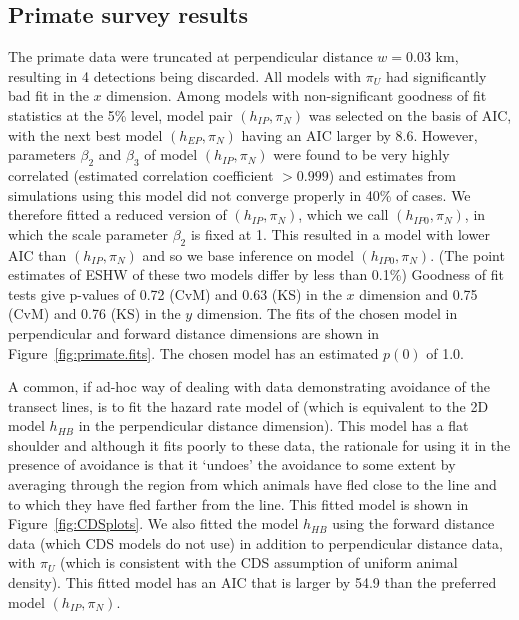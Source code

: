 \documentclass[useAMS,usenatbib,referee]{biom}
\begin{document}
\subsection{Primate survey results}

The primate data were truncated at perpendicular distance $w=0.03$ km, resulting in 4 detections being discarded. All models with $\pi_{U}$ had significantly bad fit in the $x$ dimension. Among models with non-significant goodness of fit statistics at the 5\% level, model pair $(h_{IP},\pi_{N})$ was selected on the basis of AIC, with the next best model $(h_{EP},\pi_{N})$ having an AIC larger by 8.6. However, parameters $\beta_2$ and $\beta_3$ of model $(h_{IP},\pi_{N})$ were found to be very highly correlated (estimated correlation coefficient $>0.999$) and estimates from simulations using this model did not converge properly in 40\% of cases. We therefore fitted a reduced version of $(h_{IP},\pi_{N})$, which we call $(h_{IP0},\pi_{N})$, in which the scale parameter $\beta_2$ is fixed at 1. This resulted in a model with lower AIC than $(h_{IP},\pi_{N})$ and so we base inference on model $(h_{IP0},\pi_{N})$. (The point estimates of ESHW of these two models differ by less than 0.1\%) Goodness of fit tests give p-values of 0.72 (CvM)  and 0.63 (KS) in the $x$ dimension and 0.75 (CvM)  and 0.76 (KS) in the $y$ dimension. The fits of the chosen model in perpendicular and forward distance dimensions are shown in Figure~\ref{fig:primate.fits}. The chosen model has an estimated $p(0)$ of 1.0. 

A common, if ad-hoc way of dealing with data demonstrating avoidance of the transect lines, is to fit the hazard rate model of \cite{Hayes+Buckland:83} (which is equivalent to the 2D model $h_{HB}$ in the perpendicular distance dimension). This model has a flat shoulder and although it fits poorly to these data, the rationale for using it in the presence of avoidance is that it `undoes' the avoidance to some extent by averaging through the region from which animals have fled close to the line and to which they have fled farther from the line. This fitted model is shown in Figure~\ref{fig:CDSplots}. We also fitted the model $h_{HB}$ using the forward distance data (which CDS models do not use) in addition to perpendicular distance data, with $\pi_{U}$ (which is consistent with the CDS assumption of uniform animal density). This fitted model has an AIC that is larger by 54.9 than the preferred model $(h_{IP},\pi_{N})$. 
\end{document}
